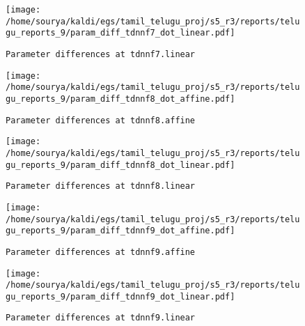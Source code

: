 \documentclass[prl,10pt,twocolumn]{revtex4}
\begin{document}
\newpage
\begin{figure}[h]
  \begin{center}
    \caption{\texttt{Parameter differences at tdnnf7.linear}}
    \texttt{[image: /home/sourya/kaldi/egs/tamil\_telugu\_proj/s5\_r3/reports/telugu\_reports\_9/param\_diff\_tdnnf7\_dot\_linear.pdf]}
  \end{center}
\end{figure}
\clearpage


\newpage
\begin{figure}[h]
  \begin{center}
    \caption{\texttt{Parameter differences at tdnnf8.affine}}
    \texttt{[image: /home/sourya/kaldi/egs/tamil\_telugu\_proj/s5\_r3/reports/telugu\_reports\_9/param\_diff\_tdnnf8\_dot\_affine.pdf]}
  \end{center}
\end{figure}
\clearpage


\newpage
\begin{figure}[h]
  \begin{center}
    \caption{\texttt{Parameter differences at tdnnf8.linear}}
    \texttt{[image: /home/sourya/kaldi/egs/tamil\_telugu\_proj/s5\_r3/reports/telugu\_reports\_9/param\_diff\_tdnnf8\_dot\_linear.pdf]}
  \end{center}
\end{figure}
\clearpage


\newpage
\begin{figure}[h]
  \begin{center}
    \caption{\texttt{Parameter differences at tdnnf9.affine}}
    \texttt{[image: /home/sourya/kaldi/egs/tamil\_telugu\_proj/s5\_r3/reports/telugu\_reports\_9/param\_diff\_tdnnf9\_dot\_affine.pdf]}
  \end{center}
\end{figure}
\clearpage


\newpage
\begin{figure}[h]
  \begin{center}
    \caption{\texttt{Parameter differences at tdnnf9.linear}}
    \texttt{[image: /home/sourya/kaldi/egs/tamil\_telugu\_proj/s5\_r3/reports/telugu\_reports\_9/param\_diff\_tdnnf9\_dot\_linear.pdf]}
  \end{center}
\end{figure}
\clearpage
\end{document}

